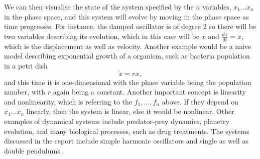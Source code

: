 \documentclass{statsmsc}
\begin{document}
We can then visualise the state of the system specified by the $n$ variables, $x_1 \dots x_n$ in the phase space, and this system will evolve by moving in the phase space as time progresses. 
For instance, the damped oscillator is of degree 2 so there will be two variables describing its evolution, which in this case will be $x$ and $\frac{dx}{dt}=\dot{x}$, which is the displacement as well as velocity.
Another example would be a naive model describing exponential growth of a organism, such as bacteria population in a petri dish
$$
\dot{x}=rx,
$$
and this time it is one-dimensional with the phase variable being the population number, with $r$ again being a constant.
Another important concept is linearity and nonlinearity, which is referring to the $f_1, \dots ,f_n$ above.
If they depend on $x_1 \dots x_n$ linearly, then the system is linear, else it would be nonlinear.
Other examples of dynamical systems include predator-prey dynamics, planetry evolution, and many biological processes, such as drug treatments.
The systems discussed in the report include simple harmonic oscillators and single as well as double pendulums.
\end{document}
